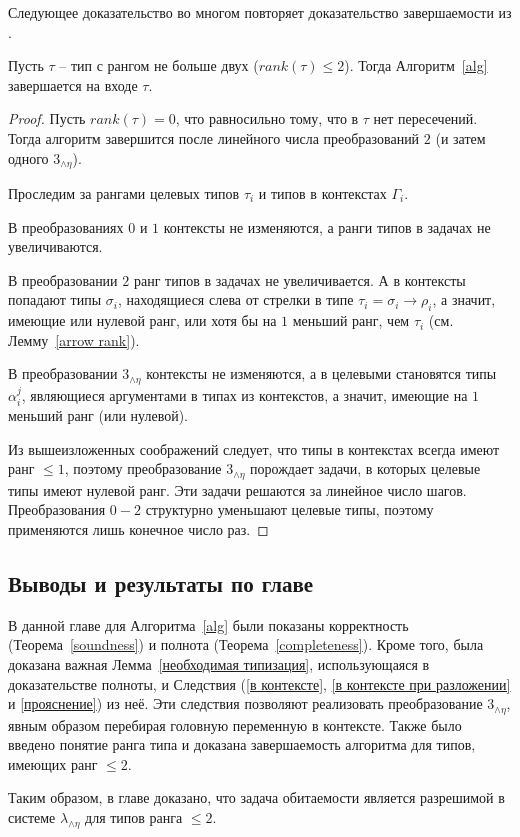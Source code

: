 \documentclass[../main.tex]{subfiles}
\begin{document}
Следующее доказательство во многом повторяет доказательство завершаемости из \cite{kusmierek_2007}.
\begin{theorem}[Termination] \label{termination}
Пусть $\tau$ -- тип с рангом не больше двух ($rank(\tau) \leqslant 2$). Тогда Алгоритм~\ref{alg} завершается на входе $\tau$.
\end{theorem}
\begin{proof}
    Пусть $rank(\tau) = 0$, что равносильно тому, что в $\tau$ нет пересечений. Тогда алгоритм завершится после линейного числа преобразований $2$ (и затем одного $3_{\wedge \eta}$).
    
    Проследим за рангами целевых типов $\tau_i$ и типов в контекстах $\Gamma_i$.
    
    В преобразованиях $0$ и $1$ контексты не изменяются, а ранги типов в задачах не увеличиваются.
    
    В преобразовании $2$ ранг типов в задачах не увеличивается. А в контексты попадают 
    типы $\sigma_i$, находящиеся слева от стрелки в типе $\tau_i = \sigma_i \to \rho_i$, а значит, имеющие или нулевой ранг, или хотя бы на $1$ меньший ранг, чем $\tau_i$ (см. Лемму~\ref{arrow rank}). 
    
    В преобразовании $3_{\wedge \eta}$ контексты не изменяются, а в целевыми становятся типы $\alpha_i^j$, являющиеся аргументами в типах из контекстов, а значит, имеющие на $1$ меньший ранг (или нулевой).
    
    Из вышеизложенных соображений следует, что типы в контекстах всегда имеют ранг $\leqslant 1$, поэтому преобразование $3_{\wedge \eta}$ порождает задачи, в которых целевые типы имеют нулевой ранг. Эти задачи решаются за линейное число шагов. 
    Преобразования $0-2$ структурно уменьшают целевые типы, поэтому применяются лишь конечное число раз.
    
    
\end{proof}

\subsection{Выводы и результаты по главе}

В данной главе для Алгоритма~\ref{alg} были показаны корректность (Теорема~\ref{soundness}) и полнота (Теорема~\ref{completeness}). Кроме того, была доказана важная Лемма~\ref{необходимая типизация}, использующаяся в доказательстве полноты, и Следствия (\ref{в контексте}, \ref{в контексте при разложении} и \ref{прояснение}) из неё. Эти следствия позволяют реализовать преобразование $3_{\wedge \eta}$, явным образом перебирая головную переменную в контексте. Также было введено понятие ранга типа и доказана завершаемость алгоритма для типов, имеющих ранг $\leqslant 2$.

Таким образом, в главе доказано, что задача обитаемости является разрешимой в системе $\lambda_{\wedge \eta}$ для типов ранга $\leqslant 2$.
\end{document}

